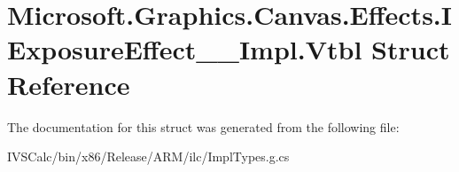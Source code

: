 \hypertarget{struct_microsoft_1_1_graphics_1_1_canvas_1_1_effects_1_1_i_exposure_effect_____impl_1_1_vtbl}{}\section{Microsoft.\+Graphics.\+Canvas.\+Effects.\+I\+Exposure\+Effect\+\_\+\+\_\+\+Impl.\+Vtbl Struct Reference}
\label{struct_microsoft_1_1_graphics_1_1_canvas_1_1_effects_1_1_i_exposure_effect_____impl_1_1_vtbl}


The documentation for this struct was generated from the following file\+:\begin{DoxyCompactItemize}
\item 
I\+V\+S\+Calc/bin/x86/\+Release/\+A\+R\+M/ilc/Impl\+Types.\+g.\+cs\end{DoxyCompactItemize}
